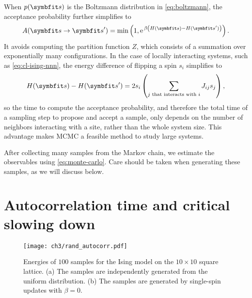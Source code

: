 When $p(\vs)$ is the Boltzmann distribution in \cref{eq:boltzmann}, the acceptance probability further simplifies to
\begin{equation}
A(\vs \to \vs') = \min\left( 1, \rme^{\,\beta \left( H(\vs) - H(\vs') \right)} \right).
\end{equation}
It avoids computing the partition function $Z$, which consists of a summation over exponentially many configurations. In the case of locally interacting systems, such as \cref{eq:cl-ising-nnn}, the energy difference of flipping a spin $s_i$ simplifies to
\begin{equation}
H(\vs) - H(\vs') = 2 s_i \left( \sum_{\text{$j$ that interacts with $i$}} J_{i j} s_j \right),
\end{equation}
so the time to compute the acceptance probability, and therefore the total time of a sampling step to propose and accept a sample, only depends on the number of neighbors interacting with a site, rather than the whole system size. This advantage makes MCMC a feasible method to study large systems.

After collecting many samples from the Markov chain, we estimate the observables using \cref{eq:monte-carlo}. Care should be taken when generating these samples, as we will discuss below.

\section{Autocorrelation time and critical slowing down}

\begin{figure}[htb]
\centering
\texttt{[image: ch3/rand\_autocorr.pdf]}
\caption[Energy of Ising model from independent and autocorrelated samples]{
Energies of $100$ samples for the Ising model on the $10 \times 10$ square lattice.
(a) The samples are independently generated from the uniform distribution.
(b) The samples are generated by single-spin updates with $\beta = 0$.
}
\label{fig:rand-autocorr}
\end{figure}

